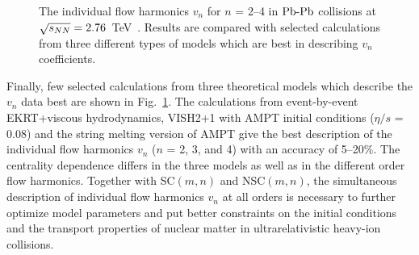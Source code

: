 \begin{figure}[h]
\begin{center}
        \caption{The individual flow harmonics $v_n$ for $n$ = 2--4 in $\textnormal{Pb-Pb}$ collisions at $\sqrt{s_{NN}}=2.76$~TeV~\cite{Adam:2016izf}. Results are compared with selected calculations from three different types of models which are best in describing $v_n$ coefficients.}
        \label{fig:Figure_A4}
              \end{center}
\end{figure}

Finally, few selected calculations from three theoretical models which describe the $v_n$ data best are shown in Fig.~\ref{fig:Figure_A4}.
The calculations from event-by-event EKRT+viscous hydrodynamics, VISH2+1 with AMPT initial conditions ($\eta/s$ = 0.08) and the string melting version of AMPT give the best description of the individual flow harmonics $v_n$ ($n$ = 2, 3, and 4) with an accuracy of 5--20\%. The centrality dependence differs in the three models as well as in the different order flow harmonics.
Together with SC$(m,n)$ and NSC$(m,n)$, the simultaneous description of individual flow harmonics $v_n$ at all orders is necessary to further optimize model parameters and put better constraints on the initial conditions and the transport properties of nuclear matter in ultrarelativistic heavy-ion collisions.
